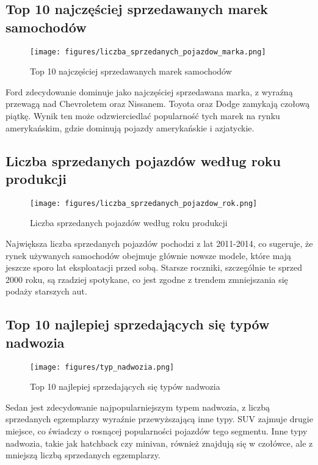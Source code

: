 \documentclass[10pt,letterpaper]{article}
\begin{document}
\subsection{Top 10 najczęściej sprzedawanych marek samochodów}
\begin{figure}[H]
\begin{center}
   \texttt{[image: figures/liczba\_sprzedanych\_pojazdow\_marka.png]}
   \caption{Top 10 najczęściej sprzedawanych marek samochodów}
   \label{fig:other-figure-log}
\end{center}
\end{figure}
Ford zdecydowanie dominuje jako najczęściej sprzedawana marka, z wyraźną przewagą nad Chevroletem oraz Nissanem. Toyota oraz Dodge zamykają czołową piątkę. Wynik ten może odzwierciedlać popularność tych marek na rynku amerykańskim, gdzie dominują pojazdy amerykańskie i azjatyckie.

\subsection{Liczba sprzedanych pojazdów według roku produkcji}
\begin{figure}[H]
\begin{center}
   \texttt{[image: figures/liczba\_sprzedanych\_pojazdow\_rok.png]}
   \caption{Liczba sprzedanych pojazdów według roku produkcji}
   \label{fig:other-figure-log}
\end{center}
\end{figure}
Największa liczba sprzedanych pojazdów pochodzi z lat 2011-2014, co sugeruje, że rynek używanych samochodów obejmuje głównie nowsze modele, które mają jeszcze sporo lat eksploatacji przed sobą. Starsze roczniki, szczególnie te sprzed 2000 roku, są rzadziej spotykane, co jest zgodne z trendem zmniejszania się podaży starszych aut.

\subsection{Top 10 najlepiej sprzedających się typów nadwozia}
\begin{figure}[H]
\begin{center}
   \texttt{[image: figures/typ\_nadwozia.png]}
   \caption{Top 10 najlepiej sprzedających się typów nadwozia}
   \label{fig:other-figure-log}
\end{center}
\end{figure}
Sedan jest zdecydowanie najpopularniejszym typem nadwozia, z liczbą sprzedanych egzemplarzy wyraźnie przewyższającą inne typy. SUV zajmuje drugie miejsce, co świadczy o rosnącej popularności pojazdów tego segmentu. Inne typy nadwozia, takie jak hatchback czy minivan, również znajdują się w czołówce, ale z mniejszą liczbą sprzedanych egzemplarzy.
\end{document}
